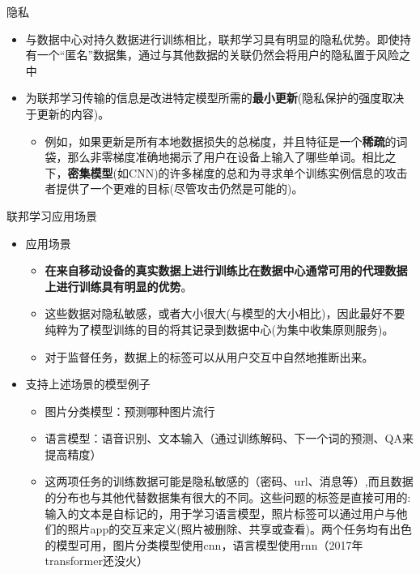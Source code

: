 \documentclass{beamer}
\begin{document}
\begin{frame}{\songti 隐私}
    \begin{itemize}
        \item 与数据中心对持久数据进行训练相比，联邦学习具有明显的隐私优势。即使持有一个“匿名”数据集，通过与其他数据的关联仍然会将用户的隐私置于风险之中
        \item 为联邦学习传输的信息是改进特定模型所需的\textbf{最小更新}(隐私保护的强度取决于更新的内容)。
        \begin{itemize}
            \item 例如，如果更新是所有本地数据损失的总梯度，并且特征是一个\textbf{稀疏}的词袋，那么非零梯度准确地揭示了用户在设备上输入了哪些单词。相比之下，\textbf{密集模型}(如CNN)的许多梯度的总和为寻求单个训练实例信息的攻击者提供了一个更难的目标(尽管攻击仍然是可能的)。
        \end{itemize}
    \end{itemize}
\end{frame}
\begin{frame}{\songti 联邦学习应用场景}
    \begin{itemize}
        \item 应用场景
        \begin{itemize}
            \item \textbf{在来自移动设备的真实数据上进行训练比在数据中心通常可用的代理数据上进行训练具有明显的优势}。
            \item 这些数据对隐私敏感，或者大小很大(与模型的大小相比)，因此最好不要纯粹为了模型训练的目的将其记录到数据中心(为集中收集原则服务)。
            \item 对于监督任务，数据上的标签可以从用户交互中自然地推断出来。
        \end{itemize}
        \item 支持上述场景的模型例子
        \begin{itemize}
            \item 图片分类模型：预测哪种图片流行
            \item 语言模型：语音识别、文本输入（通过训练解码、下一个词的预测、QA来提高精度）
            \item 这两项任务的训练数据可能是隐私敏感的（密码、url、消息等）,而且数据的分布也与其他代替数据集有很大的不同。这些问题的标签是直接可用的:输入的文本是自标记的，用于学习语言模型，照片标签可以通过用户与他们的照片app的交互来定义(照片被删除、共享或查看)。两个任务均有出色的模型可用，图片分类模型使用cnn，语言模型使用rnn（2017年transformer还没火）
        \end{itemize}
    \end{itemize}
\end{frame}
\end{document}
